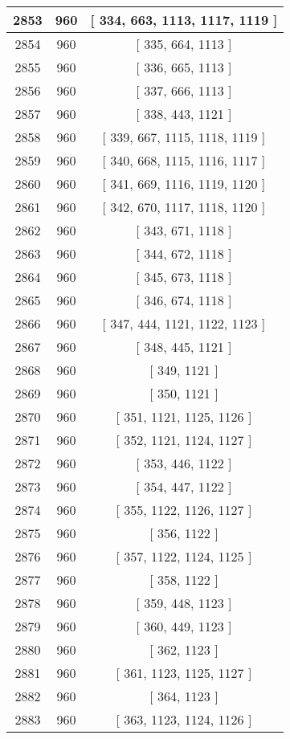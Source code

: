 \begin{center}
\begin{longtable}[H]{|| c c c ||}
\hline
2853 & 960 & [ 334, 663, 1113, 1117, 1119 ] \\ 
\hline
2854 & 960 & [ 335, 664, 1113 ] \\ 
\hline
2855 & 960 & [ 336, 665, 1113 ] \\ 
\hline
2856 & 960 & [ 337, 666, 1113 ] \\ 
\hline
2857 & 960 & [ 338, 443, 1121 ] \\ 
\hline
2858 & 960 & [ 339, 667, 1115, 1118, 1119 ] \\ 
\hline
2859 & 960 & [ 340, 668, 1115, 1116, 1117 ] \\ 
\hline
2860 & 960 & [ 341, 669, 1116, 1119, 1120 ] \\ 
\hline
2861 & 960 & [ 342, 670, 1117, 1118, 1120 ] \\ 
\hline
2862 & 960 & [ 343, 671, 1118 ] \\ 
\hline
2863 & 960 & [ 344, 672, 1118 ] \\ 
\hline
2864 & 960 & [ 345, 673, 1118 ] \\ 
\hline
2865 & 960 & [ 346, 674, 1118 ] \\ 
\hline
2866 & 960 & [ 347, 444, 1121, 1122, 1123 ] \\ 
\hline
2867 & 960 & [ 348, 445, 1121 ] \\ 
\hline
2868 & 960 & [ 349, 1121 ] \\ 
\hline
2869 & 960 & [ 350, 1121 ] \\ 
\hline
2870 & 960 & [ 351, 1121, 1125, 1126 ] \\ 
\hline
2871 & 960 & [ 352, 1121, 1124, 1127 ] \\ 
\hline
2872 & 960 & [ 353, 446, 1122 ] \\ 
\hline
2873 & 960 & [ 354, 447, 1122 ] \\ 
\hline
2874 & 960 & [ 355, 1122, 1126, 1127 ] \\ 
\hline
2875 & 960 & [ 356, 1122 ] \\ 
\hline
2876 & 960 & [ 357, 1122, 1124, 1125 ] \\ 
\hline
2877 & 960 & [ 358, 1122 ] \\ 
\hline
2878 & 960 & [ 359, 448, 1123 ] \\ 
\hline
2879 & 960 & [ 360, 449, 1123 ] \\ 
\hline
2880 & 960 & [ 362, 1123 ] \\ 
\hline
2881 & 960 & [ 361, 1123, 1125, 1127 ] \\ 
\hline
2882 & 960 & [ 364, 1123 ] \\ 
\hline
2883 & 960 & [ 363, 1123, 1124, 1126 ] \\ 

\end{longtable}
\end{center}
